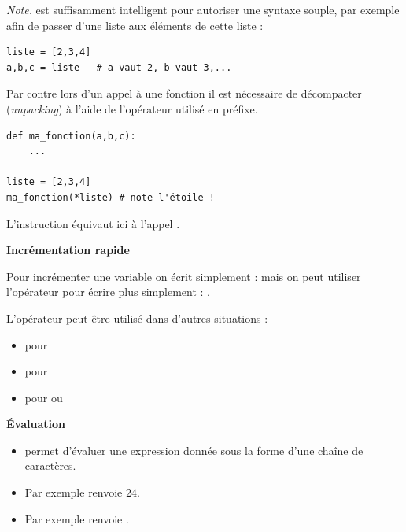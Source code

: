 \documentclass[11pt,class=report,crop=false]{standalone}
\begin{document}
\emph{Note.} \Python{} est suffisamment intelligent pour autoriser une syntaxe souple, par exemple afin de passer d'une liste aux éléments de cette liste :
\begin{lstlisting}		
liste = [2,3,4]
a,b,c = liste	# a vaut 2, b vaut 3,...
\end{lstlisting}
Par contre lors d'un appel à une fonction il est nécessaire de décompacter (\emph{unpacking}) à l'aide de l'opérateur \og{}\ci{*}\fg{} utilisé en préfixe.
\begin{lstlisting}
def ma_fonction(a,b,c):
    ...
    
liste = [2,3,4]
ma_fonction(*liste) # note l'étoile ! 
\end{lstlisting}
L'instruction  équivaut ici à l'appel .



\bigskip

\textbf{Incrémentation rapide}

Pour incrémenter une variable on écrit simplement :
mais on peut utiliser l'opérateur \og{}\ci{+=}\fg{} pour écrire  plus simplement :
.

L'opérateur \og{}\ci{+=}\fg{} peut être utilisé dans d'autres situations :
\begin{itemize}
	\item {} \quad pour 
	
	\item {} \quad pour 
	
	\item{} \quad pour  ou 	
\end{itemize}



\bigskip

\textbf{\'Evaluation}

\begin{itemize}
\item {} permet d'évaluer une expression donnée sous la forme d'une chaîne de caractères. 

\item Par exemple  renvoie $24$.

\item Par exemple  renvoie .
\end{itemize}
\end{document}
